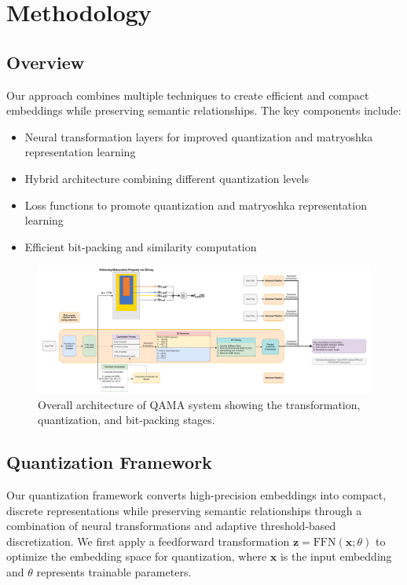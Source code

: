 \section{Methodology}
\label{sec:methodology}

\subsection{Overview}
Our approach combines multiple techniques to create efficient and compact embeddings while preserving semantic relationships. The key components include:
\begin{itemize}
    \item Neural transformation layers for improved quantization and matryoshka representation learning
    \item Hybrid architecture combining different quantization levels
    \item Loss functions to promote quantization and matryoshka representation learning
    \item Efficient bit-packing and similarity computation
\end{itemize}

\begin{figure}[h]
    \centering
    \includegraphics[width=\textwidth]{main-diagram.pdf}
    \caption{Overall architecture of QAMA system showing the transformation, quantization, and bit-packing stages.}
    \label{fig:system_architecture}
\end{figure}


\subsection{Quantization Framework}
\label{subsec:quantization_framework}

Our quantization framework converts high-precision embeddings into compact, discrete representations while preserving semantic relationships through a combination of neural transformations and adaptive threshold-based discretization. We first apply a feedforward transformation $\mathbf{z} = \text{FFN}(\mathbf{x}; \theta)$ to optimize the embedding space for quantization, where $\mathbf{x}$ is the input embedding and $\theta$ represents trainable parameters.

